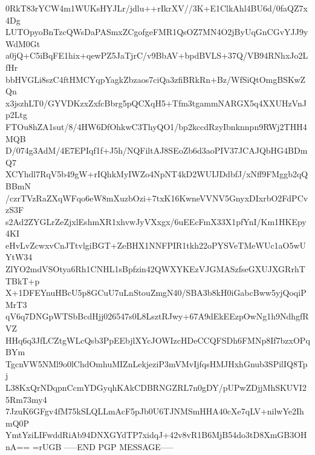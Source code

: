 0RkT83rYCW4m1WUKsHYJLr/jdlu++rIkrXV//3K+E1ClkAhl4BU6d/0faQZ7x4Dg
LUTOpyoBnTzcQWsDaPASmxZCgofgeFMR1QsOZ7MN4O2jByUqGnCGvYJJ9yWdM0Gt
a0jQ+C5iBqFE1hix+qewPZ5JaTjrC/v9BbAV+bpdBVLS+37Q/VB94RNhxJo2LfHr
bbHVGLi8szC4ftHMCYqpYagkZbzaos7ciQa3zfiBRkRn+Bz/WfSiQtOmgBSKwZQn
x3jszhLT0/GYVDKzxZxfcBbrg5pQCXqH5+Tfm3tgammNARGX5q4XXUHzVnJp2Ltg
FTOu8hZA1sut/8/4HW6DfOhkwC3ThyQO1/bp2kccdRzyIbnknnpn9RWj2THH4MQB
D/074g3AdM/4E7EPIqf1f+J5h/NQFiltAJ8SEoZb6d3aoPIV37JCAJQbHG4BDmQ7
XCYhdl7RqV5b49gW+rIQhkMyIWZo4NpNT4kD2WUIJDdbfJ/xNff9FMggb2qQBBmN
/czrTVzRaZXqWFqo6eW8mXuzbOzi+7txK16KwneVVNV5GnyxDIxrbO2FdPCvzS3F
s2Ad2ZYGLrZeZjxlEshmXR1xhvwJyVXxgx/6uEEcFmX33X1pfYnI/Km1HKEpy4KI
eHvLvZcwxvCnJTtvlgiBGT+ZeBHX1NNFPIR1tkh22oPYSVeTMeWUc1aO5wUYtW34
ZlYO2mdVSOtya6Rh1CNHL1sBpfzin42QWXYKEzVJGMASzfseGXUJXGRrhTTBkT+p
X+1DFEYnuHBcU5p8GCuU7uLnStouZmgN40/SBA3b8kH0iGabcBww5yjQoqiPMrT3
qV6q7DNGpWTSbBcdHjj026547s0L8LsztRJwy+67A9dEkEEzpOwNg1h9NdhgfRVZ
HHq6q3JfLCZtgWLcQsb3PpEEbjlXYcJOWIzcHDeCCQFSDh6FMNp8If7bzxOPqBYm
TgcnVW5NMl9o0lChdOmhuMIZnLekjeziP3mVMvIjfqsHMJHxhGnub3SPilIQ8Tpj
L38KxQrNDqpnCcmYDGyqhKAkCDBRNGZRL7n0gDY/pUPwZDjjMhSKUVI25Rm73my4
7JzuK6GFgv4fM75kSLQLLmAcF5pJb0U6TJNMSmHHA40cXe7qLV+nilwYe2IhmQ0P
YmtYziLIFwddRiAb94DNXGYdTP7xidqJ+42v8vR1B6MjB54do3tD8XmGB3OHnA==
=rUGB
-----END PGP MESSAGE-----
